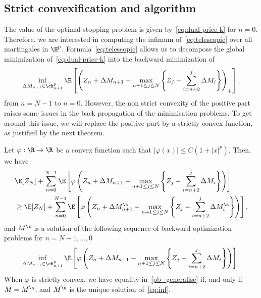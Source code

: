 \subsection{Strict convexification and algorithm}

The value of the optimal stopping problem is given by~\eqref{eq:dual-price-k} for $n=0$. Therefore,  we are interested in computing the infimum of~\eqref{eq:telescopic} over all martingales in $\H^p$. Formula~\eqref{eq:telescopic} allows us to decompose the global minimization of~\eqref{eq:dual-price-k} into the backward minimization of \[
  \inf_{\Delta M_{n+1} \in \ch^p_{n+1}}\E\left[ \left(Z_{n} + \Delta M_{n+1}  - \max_{n + 1\le j \le N} \left\{Z_{j} - \sum_{i=n+2}^{j} \Delta M_i\right\}\right)_+\right],
  \]
from $n=N-1$ to $n=0$. However, the non strict convexity of the positive part raises some issues in the  back propagation of the minimisation problems. To get around this issue, we will replace the positive part by a strictly convex function, as justified by the next theorem.
\begin{theorem}\label{thm:main}
  Let $\varphi:\R \to \R$ be a convex function such that $|\varphi(x)|\le C(1+|x|^p)$. Then, we have
 \begin{align}\label{pb_generalise}
  &\E[Z_N] + \sum_{n=0}^{N-1} \E\left[ \varphi\left(Z_{n} + \Delta M_{n+1} - \max_{n + 1\le j \le N} \left\{Z_{j} - \sum_{i=n+2}^{j} \Delta M_i\right\} \right)\right]\\
  &\ge \E[Z_N] + \sum_{n=0}^{N-1} \E\left[ \varphi \left(Z_{n} + \Delta M^\s_{n+1} - \max_{n + 1\le j \le N} \left\{Z_{j} - \sum_{i=n+2}^{j} \Delta M^\s_i\right\} \right)\right],\notag
 \end{align}  
 and $M^\s$ is a solution of the following sequence of backward optimization problems for $n=N-1,\dots,0$
 \begin{equation} \label{eq:inf}
 \inf_{\Delta M_{n+1} \in \ch^p_{n+1}}\E\left[ \varphi \left(Z_{n} + \Delta M_{n+1}  - \max_{n + 1\le j \le N} \left\{Z_{j} - \sum_{i=n+2}^{j} \Delta M_i\right\}\right)\right].
 \end{equation}
 When $\varphi$ is strictly convex, we have equality in~\eqref{pb_generalise} if, and only if $M=M^\s$, and $M^\s$ is the unique solution of~\eqref{eq:inf}.
\end{theorem}

